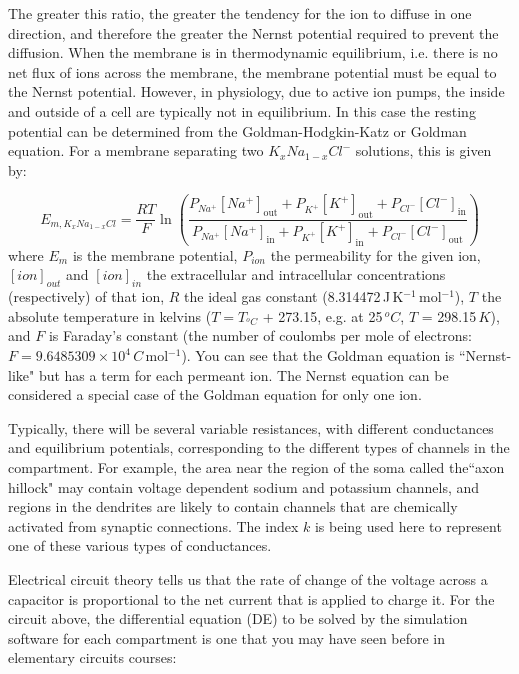 \documentclass[12pt]{article}
\begin{document}
The greater this ratio, the greater the tendency for the ion to diffuse in one direction, and therefore the greater the Nernst potential required to prevent the diffusion. When the membrane is in thermodynamic equilibrium, i.e. there is no net flux of ions across the membrane, the membrane potential must be equal to the Nernst potential. However, in physiology, due to active ion pumps, the inside and outside of a cell are typically not in equilibrium. In this case the resting potential can be determined from the Goldman-Hodgkin-Katz or Goldman equation. For a membrane separating two $K_xNa_{1-x}Cl^-$ solutions, this is given by:

\begin{displaymath}
    E_{m, K_{x}Na_{1-x}Cl } = \frac{RT}{F} \ln{ \left( \frac{ P_{Na^{+}}[Na^{+}]_\mathrm{out} + P_{K^{+}}[K^{+}]_\mathrm{out} + P_{Cl^{-}}[Cl^{-}]_\mathrm{in} }{ P_{Na^{+}}[Na^{+}]_\mathrm{in} + P_{K^{+}}[K^{+}]_{\mathrm{in}} + P_{Cl^{-}}[Cl^{-}]_\mathrm{out} } \right) }
\end{displaymath}
where $E_m$ is the membrane potential, $P_{ion}$ the permeability for the given ion, $[ion]_{out}$ and $[ion]_{in}$ the extracellular and intracellular concentrations (respectively) of that ion, $R$ the ideal gas constant (8.314472\,J\,K$^{-1}$\,mol$^{-1}$), $T$ the absolute temperature in kelvins ($T =T_{^oC}$ + 273.15, e.g. at 25\,$^oC$, $T$ = 298.15\,$K$), and $F$ is Faraday's constant (the number of coulombs per mole of electrons: $F = 9.6485309\times10^4\,C$\,mol$^{-1}$). You can see that the Goldman equation is ``Nernst-like" but has a term for each permeant ion. The Nernst equation can be considered a special case of the Goldman equation for only one ion.

Typically, there will be several variable resistances, with different conductances and equilibrium potentials, corresponding to the different types of channels in the compartment. For example, the area near the region of the soma called the``axon hillock" may contain voltage dependent sodium and potassium channels, and regions in the dendrites are likely to contain channels that are chemically activated from synaptic connections. The index $k$ is being used here to represent one of these various types of conductances.

Electrical circuit theory tells us that the rate of change of the voltage across a capacitor is proportional to the net current that is applied to charge it. For the circuit above, the differential equation (DE) to be solved by the simulation software for each compartment is one that you may have seen before in elementary circuits courses:
\end{document}
